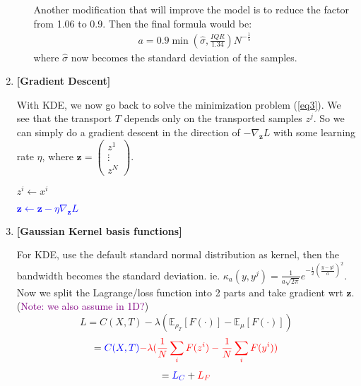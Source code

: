 \documentclass[11pt]{article}
\begin{document}
\begin{enumerate}
\begin{enumerate}
        Another modification that will improve the model is to reduce the factor from 1.06 to 0.9. Then the final formula would be:
        \begin{align*}
            a = 0.9 \min (\hat{\sigma}, \frac{IQR}{1.34}) N^{-\frac{1}{5}}
        \end{align*}
        where $\hat{\sigma}$ now becomes the standard deviation of the samples.
    \end{enumerate}
    
    \item {\bf [Gradient Descent]}
    
    With KDE, we now go back to solve the minimization problem (\ref{eq3}).
    We see that the transport $T$ depends only on the transported samples $z^j$. So we can simply do a gradient descent in the direction of $-\nabla_{\mathbf{z}} L$ with some learning rate $\eta$, where $\mathbf{z} = \begin{pmatrix}
    z^1 \\ \vdots \\ z^N
    \end{pmatrix}$.
    
        \begin{algorithm}[h]
        \caption{Gradient Descent w.r.t $\mathbf{z}$}
        \begin{algorithmic}
        \State $z^i \gets x^i$
        \EndFor
            
        \textcolor{blue}{\State $\mathbf{z} \gets \mathbf{z} - \eta \nabla_{\mathbf{z}} L$} 
        \EndWhile
            
        \end{algorithmic}
        \end{algorithm}
    
    \item {\bf [Gaussian Kernel basis functions]}
    
    For KDE, use the default standard normal distribution as kernel, then the bandwidth becomes the standard deviation.
    ie. $\kappa_a(y,y^j) = \frac{1}{a \sqrt{2\pi}} e^{-\frac{1}{2}(\frac{y-y^j}{a})^2}$. Now we split the Lagrange/loss function into 2 parts and take gradient wrt $\mathbf{z}$. (\textcolor{purple}{Note: we also assume in 1D?})
    $$
    L = C(X,T) - \lambda (\mathbb{E}_{\rho_{T}} [F(\cdot)] - \mathbb{E}_{\mu} [F(\cdot)])
    $$
    $$
    = \textcolor{blue}{C(X,T)} \textcolor{red}{- \lambda (\frac{1}{N} \sum_i F(z^i) - \frac{1}{N} \sum_i F(y^i))}
    $$
    \begin{align}
        = \textcolor{blue}{L_C} + \textcolor{red}{L_F}
    \end{align}
    

\end{enumerate}
\end{document}
